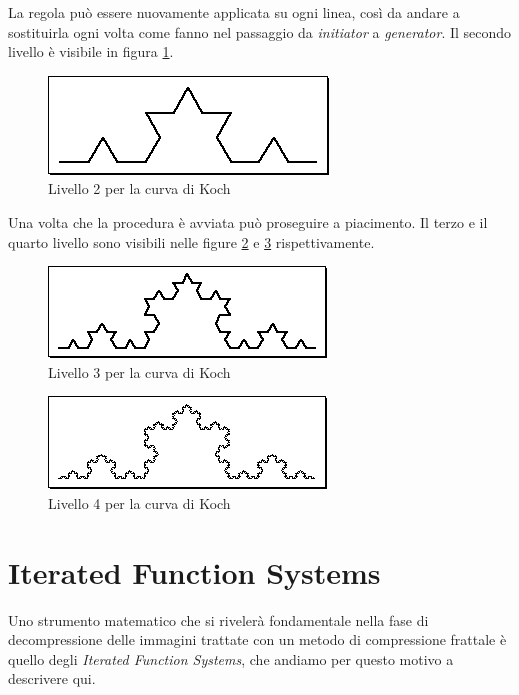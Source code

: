 \documentclass[11pt,a4paper,appendixprefix=true,numbers=noenddot]{scrreprt}
\begin{document}
La regola può essere nuovamente applicata su ogni linea, così da andare a sostituirla ogni volta come fanno nel passaggio da \textit{initiator} a \textit{generator}. Il secondo livello è visibile in figura \ref{fig:k2}.

\begin{figure}[!ht]
\centering
\includegraphics[scale=0.55]{images/koch2.png}
\caption{Livello 2 per la curva di Koch}
\label{fig:k2}
\end{figure}

\FloatBarrier

Una volta che la procedura è avviata può proseguire a piacimento. Il terzo e il quarto livello sono visibili nelle figure \ref{fig:k3} e \ref{fig:k4} rispettivamente.

\begin{figure}[!ht]
\centering
\includegraphics[scale=0.55]{images/koch3.png}
\caption{Livello 3 per la curva di Koch}
\label{fig:k3}
\end{figure}

\begin{figure}[!ht]
\centering
\includegraphics[scale=0.55]{images/koch4.png}
\caption{Livello 4 per la curva di Koch}
\label{fig:k4}
\end{figure}



\section{Iterated Function Systems}

Uno strumento matematico che si rivelerà fondamentale nella fase di decompressione delle immagini trattate con un metodo di compressione frattale è quello degli \emph{Iterated Function Systems}, che andiamo per questo motivo a descrivere qui.
\end{document}

